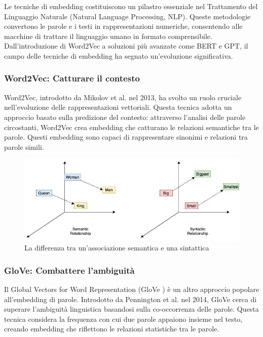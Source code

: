 Le tecniche di embedding costituiscono un pilastro essenziale nel Trattamento del Linguaggio Naturale (Natural Language Processing, NLP). Queste metodologie convertono le parole e i testi in rappresentazioni numeriche, consentendo alle macchine di trattare il linguaggio umano in formato comprensibile. Dall'introduzione di Word2Vec a soluzioni più avanzate come BERT e GPT, il campo delle tecniche di embedding ha segnato un'evoluzione significativa.

\subsubsection{Word2Vec: Catturare il contesto}
Word2Vec, introdotto da Mikolov et al. nel 2013, ha svolto un ruolo cruciale nell'evoluzione delle rappresentazioni vettoriali. Questa tecnica adotta un approccio basato sulla predizione del contesto: attraverso l'analisi delle parole circostanti, Word2Vec crea embedding che catturano le relazioni semantiche tra le parole. Questi embedding sono capaci di rappresentare sinonimi e relazioni tra parole simili.
\begin{center}
    \begin{figure}[H]
        \includegraphics[width=0.6\pdfpagewidth]{images/semanticandsintatic.jpg}
        \caption{La differenza tra un'associazione semantica e una sintattica}
    \end{figure}    
\end{center}

\subsubsection{GloVe: Combattere l'ambiguità}
Il Global Vectors for Word Representation (GloVe \cite{glove}) è un altro approccio popolare all'embedding di parole. Introdotto da Pennington et al. nel 2014, GloVe cerca di superare l'ambiguità linguistica basandosi sulla co-occorrenza delle parole. Questa tecnica considera la frequenza con cui due parole appaiono insieme nel testo, creando embedding che riflettono le relazioni statistiche tra le parole.

